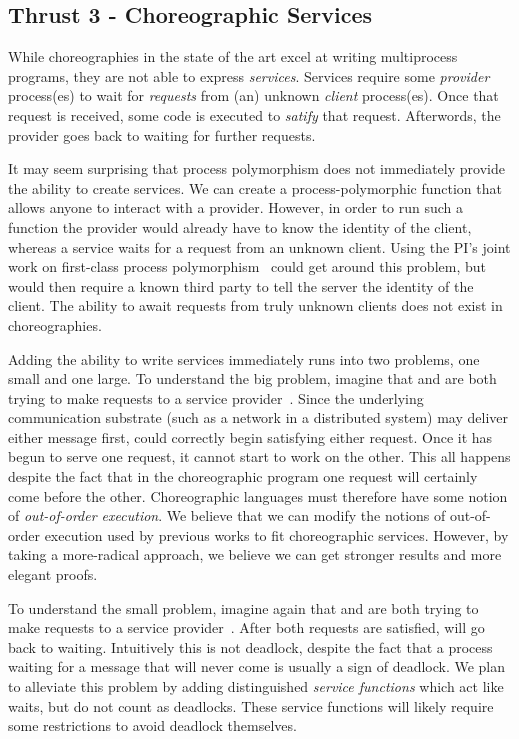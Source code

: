 \subsection{Thrust 3 - Choreographic Services}
\label{sec:t3}

While choreographies in the state of the art excel at writing multiprocess programs, they are not able to express \emph{services}.
Services require some \emph{provider} process(es) to wait for \emph{requests} from (an) unknown \emph{client} process(es).
Once that request is received, some code is executed to \emph{satify} that request.
Afterwords, the provider goes back to waiting for further requests.

It may seem surprising that process polymorphism does not immediately provide the ability to create services.
We can create a process-polymorphic function that allows anyone to interact with a provider.
However, in order to run such a function the provider would already have to know the identity of the client, whereas a service waits for a request from an unknown client.
Using the PI's joint work on first-class process polymorphism~\cite{SamuelsonHC25} could get around this problem, but would then require a known third party to tell the server the identity of the client.
The ability to await requests from truly unknown clients does not exist in choreographies.

Adding the ability to write services immediately runs into two problems, one small and one large.
To understand the big problem, imagine that \Alice{} and \Bob{} are both trying to make requests to a service provider~\Server.
Since the underlying communication substrate (such as a network in a distributed system) may deliver either message first, \Server{} could correctly begin satisfying either request.
Once it has begun to serve one request, it cannot start to work on the other.
This all happens despite the fact that in the choreographic program one request will certainly come before the other.
Choreographic languages must therefore have some notion of \emph{out-of-order execution}.
We believe that we can modify the notions of out-of-order execution used by previous works to fit choreographic services.
However, by taking a more-radical approach, we believe we can get stronger results and more elegant proofs.

To understand the small problem, imagine again that \Alice{} and \Bob{} are both trying to make requests to a service provider~\Server.
After both requests are satisfied, \Server{} will go back to waiting.
Intuitively this is not deadlock, despite the fact that a process waiting for a message that will never come is usually a sign of deadlock.
We plan to alleviate this problem by adding distinguished \emph{service functions} which act like waits, but do not count as deadlocks.
These service functions will likely require some restrictions to avoid deadlock themselves.


